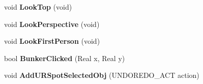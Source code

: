 \begin{DoxyCompactItemize}
\item 
\hypertarget{class_p_f_b_application_a0698f84278e02d837e2311530ac5e322}{
void {\bfseries LookTop} (void)}
\label{class_p_f_b_application_a0698f84278e02d837e2311530ac5e322}

\item 
\hypertarget{class_p_f_b_application_a2790600a53f8ef2eddd53c60d98a6fde}{
void {\bfseries LookPerspective} (void)}
\label{class_p_f_b_application_a2790600a53f8ef2eddd53c60d98a6fde}

\item 
\hypertarget{class_p_f_b_application_a967c1797d3dacebaceb7b2ae3dc3d754}{
void {\bfseries LookFirstPerson} (void)}
\label{class_p_f_b_application_a967c1797d3dacebaceb7b2ae3dc3d754}

\item 
\hypertarget{class_p_f_b_application_a1cdf84be45c58f4198abf58eb05c0275}{
bool {\bfseries BunkerClicked} (Real x, Real y)}
\label{class_p_f_b_application_a1cdf84be45c58f4198abf58eb05c0275}

\item 
\hypertarget{class_p_f_b_application_a77221f1b24a7edc09526f9f1f5cd470a}{
void {\bfseries AddURSpotSelectedObj} (UNDOREDO\_\-ACT action)}
\label{class_p_f_b_application_a77221f1b24a7edc09526f9f1f5cd470a}

\end{DoxyCompactItemize}
